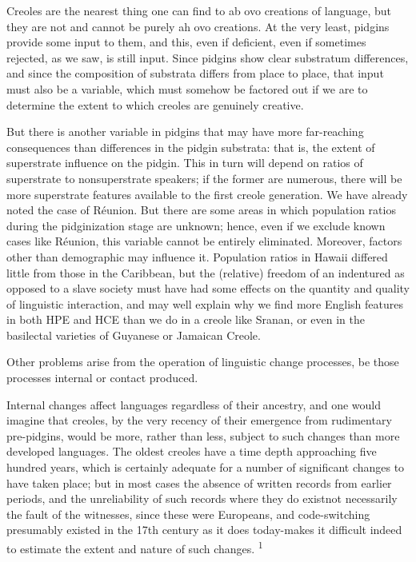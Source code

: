 Creoles are the nearest thing one can find to ab ovo creations of language, but they are not and cannot be purely ah ovo creations. At the very least, pidgins provide some input to them, and this, even if deficient, even if sometimes rejected, as we saw, is still input. Since pidgins show clear substratum differences, and since the composition of substrata differs from place to place, that input must also be a variable, which must somehow be factored out if we are to determine the extent to which creoles are genuinely creative.


But there is another variable in pidgins that may have more far-reaching consequences than differences in the pidgin substrata: that is, the extent of superstrate influence on the pidgin. This in turn will depend on ratios of superstrate to nonsuperstrate speakers; if the former are numerous, there will be more superstrate features avail\-able to the first creole generation. We have already noted the case of Réunion. But there are some areas in which population ratios during the pidginization stage are unknown; hence, even if we exclude known cases like Réunion, this variable cannot be entirely eliminated. More\-over, factors other than demographic may influence it. Population ratios in Hawaii differed little from those in the Caribbean, but the (relative) freedom of an indentured as opposed to a slave society must have had some effects on the quantity and quality of linguistic inter\-action, and may well explain why we find more English features in both HPE and HCE than we do in a creole like Sranan, or even in the basilectal varieties of Guyanese or Jamaican Creole.

Other problems arise from the operation of linguistic change processes, be those processes internal or contact produced.

Internal changes affect languages regardless of their ancestry, and one would imagine that creoles, by the very recency of their emergence from rudimentary pre-pidgins, would be more, rather than less, subject to such changes than more developed languages. The oldest creoles have a time depth approaching five hundred years, which is certainly adequate for a number of significant changes to have taken place; but in most cases the absence of written records from earlier periods, and the unreliability of such records where they do exist\-not necessarily the fault of the witnesses, since these were Europeans, and code-switching presumably existed in the 17th century as it does today-makes it difficult indeed to estimate the extent and nature of such changes. \textsuperscript{1}

